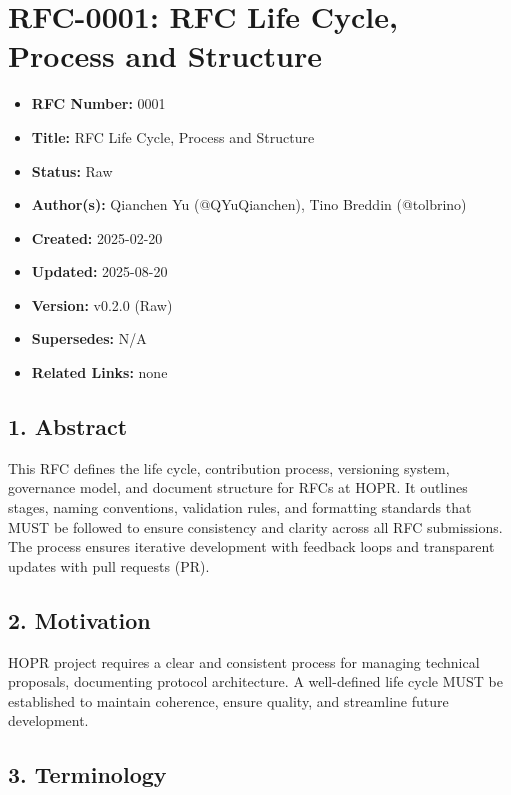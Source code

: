 \section{RFC-0001: RFC Life Cycle, Process and
Structure}\label{rfc-0001-rfc-life-cycle-process-and-structure}

\begin{itemize}
\tightlist
\item
  \textbf{RFC Number:} 0001
\item
  \textbf{Title:} RFC Life Cycle, Process and Structure
\item
  \textbf{Status:} Raw
\item
  \textbf{Author(s):} Qianchen Yu (@QYuQianchen), Tino Breddin
  (@tolbrino)
\item
  \textbf{Created:} 2025-02-20
\item
  \textbf{Updated:} 2025-08-20
\item
  \textbf{Version:} v0.2.0 (Raw)
\item
  \textbf{Supersedes:} N/A
\item
  \textbf{Related Links:} none
\end{itemize}

\subsection{1. Abstract}\label{abstract}

This RFC defines the life cycle, contribution process, versioning
system, governance model, and document structure for RFCs at HOPR. It
outlines stages, naming conventions, validation rules, and formatting
standards that MUST be followed to ensure consistency and clarity across
all RFC submissions. The process ensures iterative development with
feedback loops and transparent updates with pull requests (PR).

\subsection{2. Motivation}\label{motivation}

HOPR project requires a clear and consistent process for managing
technical proposals, documenting protocol architecture. A well-defined
life cycle MUST be established to maintain coherence, ensure quality,
and streamline future development.

\subsection{3. Terminology}\label{terminology}

